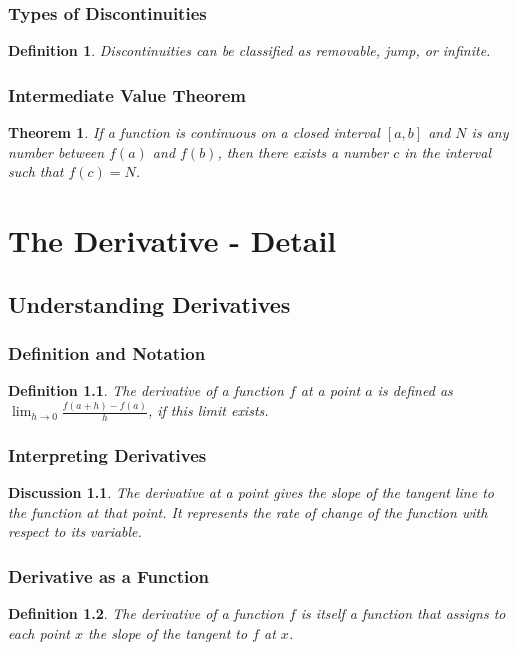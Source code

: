 \documentclass[a4paper,12pt]{book}
\newtheorem{theorem}{Theorem}
\newtheorem{definition}{Definition}
\newtheorem{discussion}{Discussion}
\begin{document}
\subsection{Types of Discontinuities}
\begin{definition}
Discontinuities can be classified as removable, jump, or infinite.
\end{definition}

\subsection{Intermediate Value Theorem}
\begin{theorem}
If a function is continuous on a closed interval \([a, b]\) and \( N \) is any number between \( f(a) \) and \( f(b) \), then there exists a number \( c \) in the interval such that \( f(c) = N \).
\end{theorem}

\chapter{The Derivative - Detail}
\section{Understanding Derivatives}
\subsection{Definition and Notation}
\begin{definition}
The derivative of a function \( f \) at a point \( a \) is defined as \(\lim_{h \to 0} \frac{f(a+h) - f(a)}{h}\), if this limit exists.
\end{definition}

\subsection{Interpreting Derivatives}
\begin{discussion}
The derivative at a point gives the slope of the tangent line to the function at that point. It represents the rate of change of the function with respect to its variable.
\end{discussion}

\subsection{Derivative as a Function}
\begin{definition}
The derivative of a function \( f \) is itself a function that assigns to each point \( x \) the slope of the tangent to \( f \) at \( x \).
\end{definition}
\end{document}
